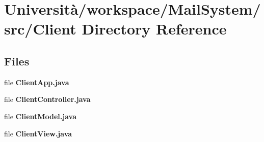 \section{Università/workspace/\+Mail\+System/src/\+Client Directory Reference}
\label{dir_6542c23925968d47f097f03e651e0856}
\subsection*{Files}
\begin{DoxyCompactItemize}
\item 
file \textbf{ Client\+App.\+java}
\item 
file \textbf{ Client\+Controller.\+java}
\item 
file \textbf{ Client\+Model.\+java}
\item 
file \textbf{ Client\+View.\+java}
\end{DoxyCompactItemize}
